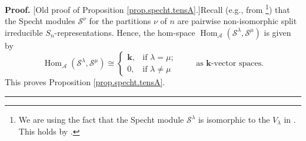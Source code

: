 \documentclass[numbers=enddot,12pt,final,onecolumn,notitlepage]{scrartcl}%
\theoremstyle{definition}
\newenvironment{noncompile}{}{}
\newenvironment{proof}[1][Proof]{\noindent\textbf{#1.} }{\ \rule{0.5em}{0.5em}}
\begin{document}
\begin{noncompile}
\begin{proof}
[Old proof of Proposition \ref{prop.specht.tensA}.]Recall (e.g., from
\cite[Theorem 5.12.2 and Corollary 5.12.4]{Etingof-et-al}\footnote{We are
using the fact that the Specht module $\mathcal{S}^{\lambda}$ is isomorphic to
the $V_{\lambda}$ in \cite{Etingof-et-al}. This holds by \cite[Theorem 5.5.13
\textbf{(b)}]{sga}.}) that the Specht modules $\mathcal{S}^{\nu}$ for the
partitions $\nu$ of $n$ are pairwise non-isomorphic split irreducible $S_{n}%
$-representations. Hence, the hom-space $\operatorname*{Hom}%
\nolimits_{\mathcal{A}}\left(  \mathcal{S}^{\lambda},\mathcal{S}^{\mu}\right)
$ is given by%
\[
\operatorname*{Hom}\nolimits_{\mathcal{A}}\left(  \mathcal{S}^{\lambda
},\mathcal{S}^{\mu}\right)  \cong%
\begin{cases}
\mathbf{k}, & \text{if }\lambda=\mu;\\
0, & \text{if }\lambda\neq\mu
\end{cases}
\ \ \ \ \ \ \ \ \ \ \text{as }\mathbf{k}\text{-vector spaces.}%
\]
This proves Proposition \ref{prop.specht.tensA}.
\end{proof}
\end{noncompile}
\end{document}
